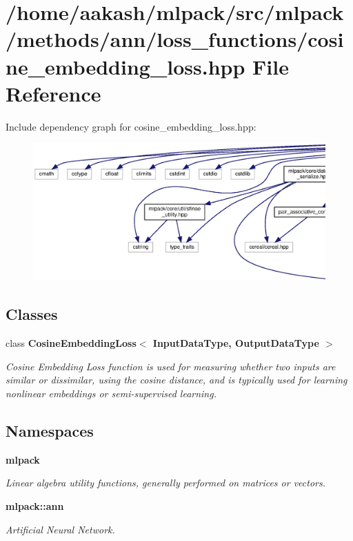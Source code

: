 \section{/home/aakash/mlpack/src/mlpack/methods/ann/loss\+\_\+functions/cosine\+\_\+embedding\+\_\+loss.hpp File Reference}
\label{cosine__embedding__loss_8hpp}
Include dependency graph for cosine\+\_\+embedding\+\_\+loss.\+hpp\+:
\nopagebreak
\begin{figure}[H]
\begin{center}
\leavevmode
\includegraphics[width=350pt]{cosine__embedding__loss_8hpp__incl}
\end{center}
\end{figure}
\subsection*{Classes}
\begin{DoxyCompactItemize}
\item 
class \textbf{ Cosine\+Embedding\+Loss$<$ Input\+Data\+Type, Output\+Data\+Type $>$}
\begin{DoxyCompactList}\small\item\em Cosine Embedding Loss function is used for measuring whether two inputs are similar or dissimilar, using the cosine distance, and is typically used for learning nonlinear embeddings or semi-\/supervised learning. \end{DoxyCompactList}\end{DoxyCompactItemize}
\subsection*{Namespaces}
\begin{DoxyCompactItemize}
\item 
 \textbf{ mlpack}
\begin{DoxyCompactList}\small\item\em Linear algebra utility functions, generally performed on matrices or vectors. \end{DoxyCompactList}\item 
 \textbf{ mlpack\+::ann}
\begin{DoxyCompactList}\small\item\em Artificial Neural Network. \end{DoxyCompactList}\end{DoxyCompactItemize}


